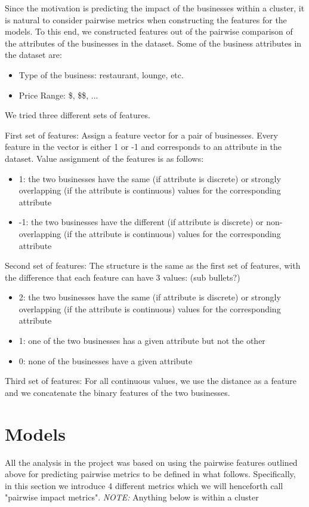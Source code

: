 \documentclass{vldb}
\begin{document}
Since the motivation is predicting the impact of the businesses within a cluster, it is natural to consider pairwise metrics when constructing the features for the models. To this end, we constructed features out of the pairwise comparison of the attributes of the businesses in the dataset. Some of the business attributes in the dataset are:
\begin{itemize}
  \item Type of the business: restaurant, lounge, etc.
  \item Price Range: \$, \$\$, ...
\end{itemize}

We tried three different sets of features.

First set of features: Assign a feature vector for a pair of businesses. Every feature in the vector is either 1 or -1 and corresponds to an attribute in the dataset. Value assignment of the features is as follows:
\begin{itemize}
\item 1: the two businesses have the same (if attribute is discrete) or strongly overlapping (if the attribute is continuous) values for the corresponding attribute
\item -1: the two businesses have the different (if attribute is discrete) or non-overlapping (if the attribute is continuous) values for the corresponding attribute
\end{itemize}

Second set of features: The structure is the same as the first set of features, with the difference that each feature can have 3 values:
(sub bullets?)
\begin{itemize}
\item 2: the two businesses have the same (if attribute is discrete) or strongly overlapping (if the attribute is continuous) values for the corresponding attribute
\item 1: one of the two businesses has a given attribute but not the other
\item 0: none of the businesses have a given attribute
\end{itemize}

Third set of features: For all continuous values, we use the distance as a feature and we concatenate the binary features of the two businesses.


\section{Models}
All the analysis in the project was based on using the pairwise features outlined above for predicting pairwise metrics to be defined in what follows.
Specifically, in this section we introduce 4 different metrics which we will henceforth call "pairwise impact metrics".
\textit{NOTE:} Anything below is within a cluster
\end{document}
